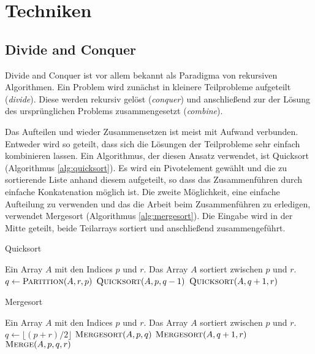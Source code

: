 \section{Techniken}

\subsection{Divide and Conquer}
Divide and Conquer ist vor allem bekannt als Paradigma von rekursiven
Algorithmen.
Ein Problem wird zunächst in kleinere Teilprobleme aufgeteilt (\emph{divide}).
Diese werden rekursiv gelöst (\emph{conquer}) und anschließend zur der Lösung
des ursprünglichen Problems zusammengesetzt (\emph{combine}).

Das Aufteilen und wieder Zusammensetzen ist meist mit Aufwand verbunden.
Entweder wird so geteilt, dass sich die Lösungen der Teilprobleme sehr einfach
kombinieren lassen. Ein Algorithmus, der diesen Ansatz verwendet, ist
Quicksort (Algorithmus \ref{alg:quicksort}).
Es wird ein Pivotelement gewählt und die zu sortierende Liste anhand diesem
aufgeteilt, so dass das Zusammenführen durch einfache Konkatenation möglich
ist.
Die zweite Möglichkeit, eine einfache Aufteilung zu verwenden und das
die Arbeit beim Zusammenführen zu erledigen, verwendet Mergesort (Algorithmus
\ref{alg:mergesort}).
Die Eingabe wird in der Mitte geteilt, beide Teilarrays sortiert und
anschließend zusammengeführt.

\begin{algorithm}
    \caption{Quicksort \cite[S.171]{cormen}}
    \label{alg:quicksort}
    \begin{algorithmic}[1]
    \Require Ein Array $A$ mit den Indices $p$ und $r$.
    \Ensure Das Array $A$ sortiert zwischen $p$ und $r$.
        \State $q \gets \textsc{Partition}(A,r,p)$
        \State $\textsc{Quicksort}(A, p, q - 1)$
        \State $\textsc{Quicksort}(A, q + 1, r)$
    \EndIf
    \end{algorithmic}
\end{algorithm}

\begin{algorithm}
    \caption{Mergesort \cite[S.34]{cormen}}
    \label{alg:mergesort}
    \begin{algorithmic}[1]
    \Require Ein Array $A$ mit den Indices $p$ und $r$.
    \Ensure Das Array $A$ sortiert zwischen $p$ und $r$.
        \State $q \gets \lfloor (p + r) / 2 \rfloor$
        \State $\textsc{Mergesort}(A, p, q)$
        \State $\textsc{Mergesort}(A, q + 1, r)$
        \State $\textsc{Merge}(A, p, q, r)$
    \EndIf
    \end{algorithmic}
\end{algorithm}

